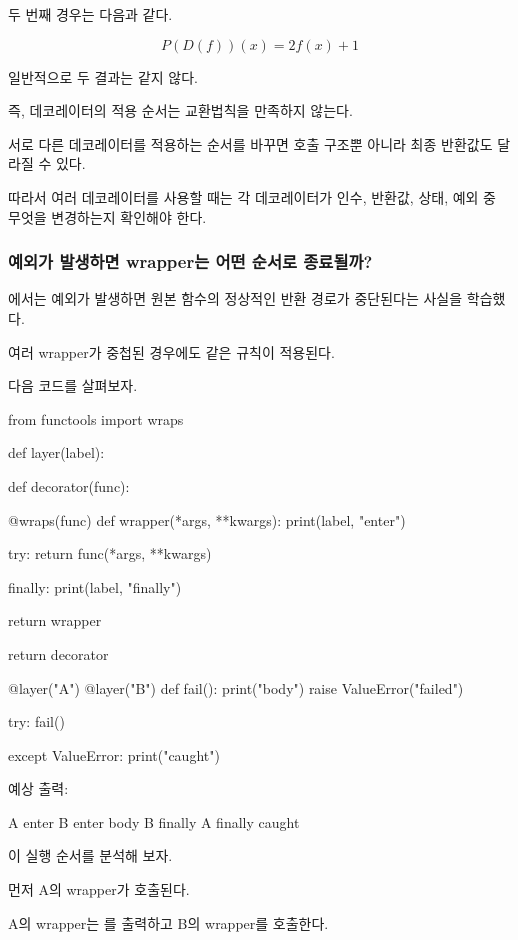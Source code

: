 두 번째 경우는 다음과 같다.

\[
P(D(f))(x)=2f(x)+1
\]

일반적으로 두 결과는 같지 않다.

즉, 데코레이터의 적용 순서는 교환법칙을 만족하지 않는다.

서로 다른 데코레이터를 적용하는 순서를 바꾸면 호출 구조뿐 아니라 최종 반환값도 달라질 수 있다.

따라서 여러 데코레이터를 사용할 때는 각 데코레이터가 인수, 반환값, 상태, 예외 중 무엇을 변경하는지 확인해야 한다.

\subsubsection{예외가 발생하면 wrapper는 어떤 순서로 종료될까?}

에서는 예외가 발생하면 원본 함수의 정상적인 반환 경로가 중단된다는 사실을 학습했다.

여러 wrapper가 중첩된 경우에도 같은 규칙이 적용된다.

다음 코드를 살펴보자.

\begin{dhkcode}
from functools import wraps

def layer(label):

    def decorator(func):

        @wraps(func)
        def wrapper(*args, **kwargs):
            print(label, "enter")

            try:
                return func(*args, **kwargs)

            finally:
                print(label, "finally")

        return wrapper

    return decorator

@layer("A")
@layer("B")
def fail():
    print("body")
    raise ValueError("failed")

try:
    fail()

except ValueError:
    print("caught")
\end{dhkcode}

예상 출력:

\begin{dhkzsh}
A enter
B enter
body
B finally
A finally
caught
\end{dhkzsh}

이 실행 순서를 분석해 보자.

먼저 A의 wrapper가 호출된다.

A의 wrapper는 를 출력하고 B의 wrapper를 호출한다.

